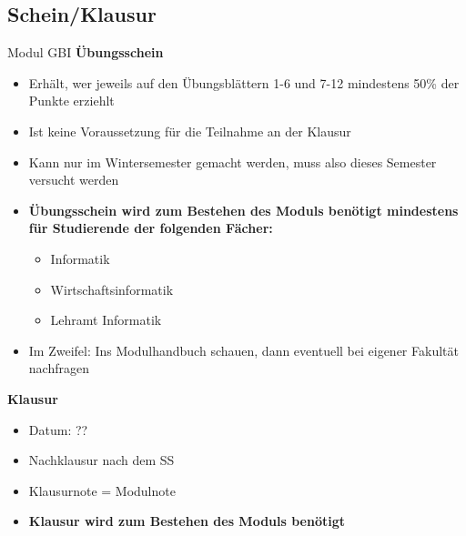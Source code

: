 \subsection{Schein/Klausur}
 \begin{frame}{Modul GBI}
		\textbf{Übungsschein}
			\begin{itemize}
				\item Erhält, wer jeweils auf den Übungsblättern 1-6 und 7-12 mindestens 50\% der Punkte erziehlt
				\item Ist keine Voraussetzung für die Teilnahme an der Klausur
				\item Kann nur im Wintersemester gemacht werden, muss also dieses Semester versucht werden
				\item \textbf{Übungsschein wird zum Bestehen des Moduls benötigt mindestens für Studierende der folgenden Fächer:} \begin{itemize}
					\item Informatik
					\item Wirtschaftsinformatik
					\item Lehramt Informatik
				\end{itemize} 
				\item Im Zweifel: Ins Modulhandbuch schauen, dann eventuell bei eigener Fakultät nachfragen
			\end{itemize}
		\pause	
		\textbf{Klausur}
		\begin{itemize}
				\item Datum: ??
				\item Nachklausur nach dem SS
				\item Klausurnote = Modulnote
				\item \textbf{Klausur wird zum Bestehen des Moduls benötigt} 
			\end{itemize}
	\end{frame}
	

